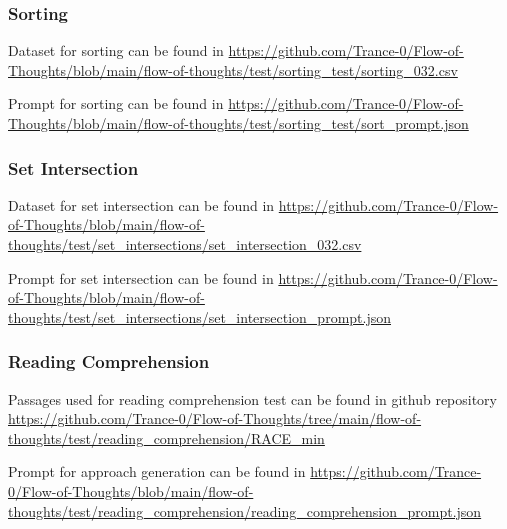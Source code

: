 \documentclass{article}
\begin{document}
\subsubsection{Sorting}
\label{sec:appendix_sorting}

Dataset for sorting can be found in \url{https://github.com/Trance-0/Flow-of-Thoughts/blob/main/flow-of-thoughts/test/sorting_test/sorting_032.csv}

Prompt for sorting can be found in \url{https://github.com/Trance-0/Flow-of-Thoughts/blob/main/flow-of-thoughts/test/sorting_test/sort_prompt.json}

\subsubsection{Set Intersection}
\label{sec:appendix_set_intersection}

Dataset for set intersection can be found in \url{https://github.com/Trance-0/Flow-of-Thoughts/blob/main/flow-of-thoughts/test/set_intersections/set_intersection_032.csv}

Prompt for set intersection can be found in \url{https://github.com/Trance-0/Flow-of-Thoughts/blob/main/flow-of-thoughts/test/set_intersections/set_intersection_prompt.json}

\subsubsection{Reading Comprehension}
\label{sec:appendix_reading_comprehension}
Passages used for reading comprehension test can be found in github repository \url{https://github.com/Trance-0/Flow-of-Thoughts/tree/main/flow-of-thoughts/test/reading_comprehension/RACE_min}

Prompt for approach generation can be found in \url{https://github.com/Trance-0/Flow-of-Thoughts/blob/main/flow-of-thoughts/test/reading_comprehension/reading_comprehension_prompt.json}
\end{document}
